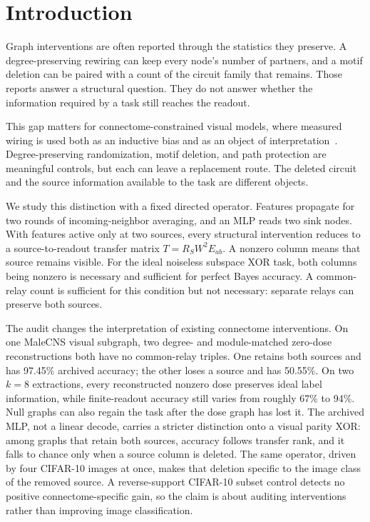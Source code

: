 \section{Introduction}
\label{sec:introduction}

Graph interventions are often reported through the statistics they preserve.
A degree-preserving rewiring can keep every node's number of partners, and a
motif deletion can be paired with a count of the circuit family that remains.
Those reports answer a structural question. They do not answer whether the
information required by a task still reaches the readout.

This gap matters for connectome-constrained visual models, where measured
wiring is used both as an inductive bias and as an object of
interpretation~\cite{lappalainen2024,structure2026}. Degree-preserving
randomization, motif deletion, and path protection are meaningful controls,
but each can leave a replacement route. The deleted circuit and the source
information available to the task are different objects.

We study this distinction with a fixed directed operator. Features propagate
for two rounds of incoming-neighbor averaging, and an MLP reads two sink
nodes. With features active only at two sources, every structural intervention
reduces to a source-to-readout transfer matrix
$T=R_SW^2E_{ab}$. A nonzero column means that source remains visible. For the
ideal noiseless subspace XOR task, both columns being nonzero is necessary and
sufficient for perfect Bayes accuracy. A common-relay count is sufficient for
this condition but not necessary: separate relays can preserve both sources.

The audit changes the interpretation of existing connectome interventions.
On one MaleCNS visual subgraph, two degree- and module-matched zero-dose
reconstructions both have no common-relay triples. One retains both sources
and has 97.45\% archived accuracy; the other loses a source and has 50.55\%.
On two $k=8$ extractions, every reconstructed nonzero dose preserves ideal
label information, while finite-readout accuracy still varies from roughly
67\% to 94\%. Null graphs can also regain the task after the dose graph has
lost it. The archived MLP, not a linear decode, carries a stricter distinction onto a visual parity XOR: among graphs that retain both sources, accuracy follows transfer rank, and it falls to chance only when a source column is deleted. The same operator, driven by four CIFAR-10 images at once, makes that deletion specific to the image class of the removed source. A reverse-support CIFAR-10 subset control detects no positive
connectome-specific gain, so the claim is about auditing interventions rather
than improving image classification.

